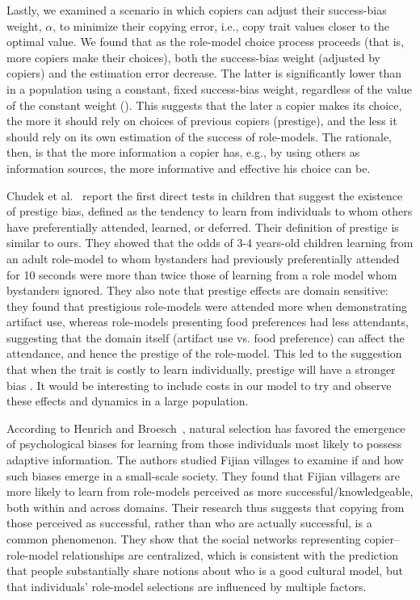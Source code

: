 \documentclass[12pt]{extarticle}
\begin{document}
Lastly, we examined a scenario in which copiers can adjust their success-bias weight, $\alpha$, to minimize their copying error, i.e., copy trait values closer to the optimal value.
We found that as the role-model choice process proceeds (that is, more copiers make their choices), both the success-bias weight (adjusted by copiers) and the estimation error decrease. 
The latter is significantly lower than in a population using a constant, fixed success-bias weight, regardless of the value of the constant weight ().
This suggests that the later a copier makes its choice, the more it should rely on choices of previous copiers (prestige), and the less it should rely on its own estimation of the success of role-models.
The rationale, then, is that the more information a copier has, e.g., by using others as information sources, the more informative and effective his choice can be.

Chudek et al.~\citep{prestige_cultural_learning} report the first direct tests in children that suggest the existence of prestige bias, defined as the tendency to learn from individuals to whom others have preferentially attended, learned, or deferred.
Their definition of prestige is similar to ours. They showed that the odds of 3-4 years-old children learning from an adult role-model to whom bystanders had previously preferentially attended for 10 seconds were more than twice those of learning from a role model whom bystanders ignored.
They also note that prestige effects are domain sensitive: they found that prestigious role-models were attended more when demonstrating artifact use, whereas role-models presenting food preferences had less attendants, suggesting that the domain itself (artifact use vs. food preference) can affect the attendance, and hence the prestige of the role-model.
This led to the suggestion that when the trait is costly to learn individually, prestige will have a stronger bias \citep{prestige_cultural_learning}.
It would be interesting to include costs in our model to try and observe these effects and dynamics in a large population.

According to Henrich and Broesch~\citep{fijian_social_bias}, natural selection has favored the emergence of psychological biases for learning from those individuals most likely to possess adaptive information. 
The authors studied Fijian villages to examine if and how such biases emerge in a small-scale society.
They found that Fijian villagers are more likely to learn from role-models perceived as more successful/knowledgeable, both within and across domains. Their research thus suggests that copying from those perceived as successful, rather than who are actually successful, is a common phenomenon. They show that the social networks representing copier--role-model relationships are centralized, which is consistent with the prediction that people substantially share notions about who is a good cultural model, but that individuals' role-model selections are influenced by multiple factors.
\end{document}

